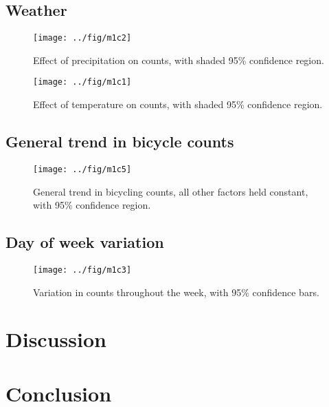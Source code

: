 \documentclass[12pt,letterpaper,article]{memoir} %
\begin{document}
\subsection*{Weather}

\begin{figure}[h!]
  \centering
  \texttt{[image: ../fig/m1c2]}
  \caption{Effect of precipitation on counts, with shaded 95\%
    confidence region.}
  \label{fg:precipitation}
\end{figure}

\begin{figure}[h!]
  \centering
  \texttt{[image: ../fig/m1c1]}
  \caption{Effect of temperature on counts, with shaded 95\%
    confidence region.}
  \label{fg:temperature}
\end{figure}



\subsection*{General trend in bicycle counts}

\begin{figure}[h!]
  \centering
  \texttt{[image: ../fig/m1c5]}
  \caption{General trend in bicycling counts, all other factors held
    constant, with 95\% confidence region.}
  \label{fg:trend}
\end{figure}



\subsection*{Day of week variation}

\begin{figure}[h!]
  \centering
  \texttt{[image: ../fig/m1c3]}
  \caption{Variation in counts throughout the week, with 95\% confidence bars.}
  \label{fg:dayofweek}
\end{figure}

\clearpage
\section*{Discussion}


\section*{Conclusion}

\printbibliography
\end{document}

